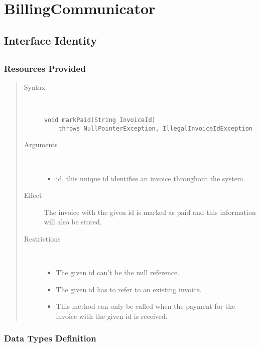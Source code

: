 
\section{BillingCommunicator}

\subsection{Interface Identity}

\subsection{}

\subsubsection{Resources Provided}

\begin{quote}
	\begin{description}
		\item[Syntax] \
		\begin{verbatim}
void markPaid(String InvoiceId)
    throws NullPointerException, IllegalInvoiceIdException
		\end{verbatim}
		\item[Arguments] \
		\begin{itemize}
		  \item id, this unique id identifies an invoice throughout the system.
		\end{itemize}
		\item[Effect] The invoice with the given id is marked as paid and this
		information will also be stored. 
		\item[Restrictions] \
		\begin{itemize}
		  \item The given id can't be the null reference.
		  \item The given id has to refer to an existing invoice.
		  \item This method can only be called when the payment for the invoice with
		  the given id is received.
		\end{itemize}
	\end{description} 
\end{quote}

\subsubsection{Data Types Definition}

